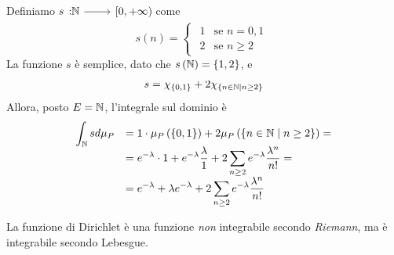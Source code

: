 \begin{examples}
\begin{enumerate}
\begin{gather}
\end{gather}
Definiamo $\funz{s}{\naturalset}{\left[0,+\infty\right)}$ come
\begin{equation*}
	s\left(n\right)=\begin{cases}
		\begin{array}{ll}
			1&\text{se }n=0,1\\
			2&\text{se }n\geq 2
		\end{array}
	\end{cases}
\end{equation*}
La funzione $s$ è semplice, dato che $s\left(\mathbb{N}\right)=\left\{1,2\right\}$, e
\begin{equation*}
	s=\chi_{\left\{0,1\right\}}+2\chi_{\left\{n\in\mathbb{N}\mid n\geq 2\right\}}
\end{equation*}
Allora, posto $E=\mathbb{N}$, l'integrale sul dominio è
\begin{equation*}
\begin{array}{ll}
	\displaystyle\int_{\mathbb{N}}sd\mu_P&=1\cdot \mu_P\left(\left\{0,1\right\}\right)+2\mu_P\left(\left\{n\in\mathbb{N}\mid n\geq 2\right\}\right)=\\
	&\displaystyle=e^{-\lambda}\cdot 1+e^{-\lambda}\frac{\lambda}{1}+2\sum_{n\geq 2}e^{-\lambda}\frac{\lambda^n}{n!}=\\
	&\displaystyle=e^{-\lambda}+\lambda e^{-\lambda}+2\sum_{n\geq 2}e^{-\lambda}\frac{\lambda^n}{n!}
\end{array}
\end{equation*}
	\end{enumerate}
\end{examples}
\begin{observe}
	La funzione di Dirichlet è una funzione \textit{non} integrabile secondo \textit{Riemann}, ma è integrabile secondo Lebesgue.
\end{observe}
